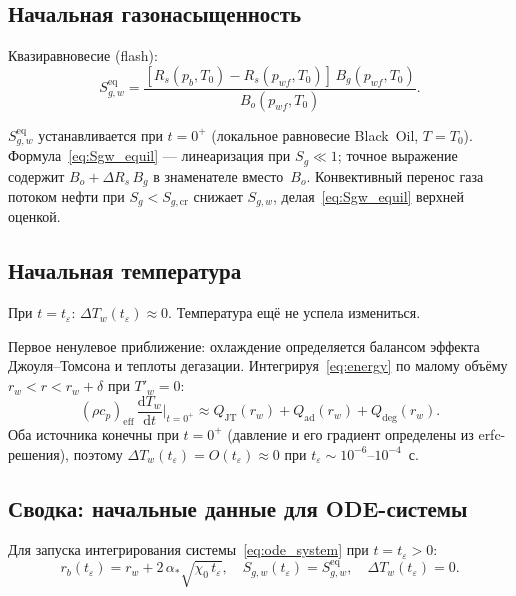 \documentclass[12pt,a4paper]{article}
\newcommand{\dd}{\mathrm{d}}
\newcommand{\eff}{\mathrm{eff}}
\begin{document}
\subsection{Начальная газонасыщенность}

Квазиравновесие (flash):
\begin{equation}\label{eq:Sgw_equil}
  \boxed{
    S_{g,w}^{\mathrm{eq}}
    = \frac{[R_s(p_b, T_0) - R_s(p_{wf}, T_0)]\,
      B_g(p_{wf}, T_0)}{B_o(p_{wf}, T_0)}.
  }
\end{equation}

$S_{g,w}^{\mathrm{eq}}$ устанавливается при $t = 0^+$
(локальное равновесие Black~Oil, $T = T_0$).
Формула~\eqref{eq:Sgw_equil} --- линеаризация при $S_g \ll 1$;
точное выражение содержит $B_o + \Delta R_s\,B_g$
в знаменателе вместо~$B_o$.
Конвективный перенос газа потоком нефти
при $S_g < S_{g,\mathrm{cr}}$ снижает $S_{g,w}$,
делая~\eqref{eq:Sgw_equil} верхней оценкой.

\subsection{Начальная температура}

При $t = t_\varepsilon$: $\Delta T_w(t_\varepsilon) \approx 0$.
Температура ещё не успела измениться.

Первое ненулевое приближение: охлаждение определяется
балансом эффекта Джоуля--Томсона и теплоты дегазации.
Интегрируя~\eqref{eq:energy} по малому объёму
$r_w < r < r_w + \delta$ при $T'_w = 0$:
\begin{equation}\label{eq:dTw_init}
  (\rho c_p)_\eff\,\frac{\dd T_w}{\dd t}\bigg|_{t=0^+}
  \approx Q_\mathrm{JT}(r_w) + Q_\mathrm{ad}(r_w) + Q_\mathrm{deg}(r_w).
\end{equation}
Оба источника конечны при $t = 0^+$ (давление и его
градиент определены из erfc-решения), поэтому
$\Delta T_w(t_\varepsilon) = O(t_\varepsilon) \approx 0$
при $t_\varepsilon \sim 10^{-6}\text{--}10^{-4}$~с.

\subsection{Сводка: начальные данные для ODE-системы}

Для запуска интегрирования системы~\eqref{eq:ode_system}
при $t = t_\varepsilon > 0$:
\begin{equation}\label{eq:ic_regularized}
  \boxed{
    r_b(t_\varepsilon) = r_w + 2\,\alpha_*\sqrt{\chi_0\,t_\varepsilon},
    \quad
    S_{g,w}(t_\varepsilon) = S_{g,w}^{\mathrm{eq}},
    \quad
    \Delta T_w(t_\varepsilon) = 0.
  }
\end{equation}
\end{document}
